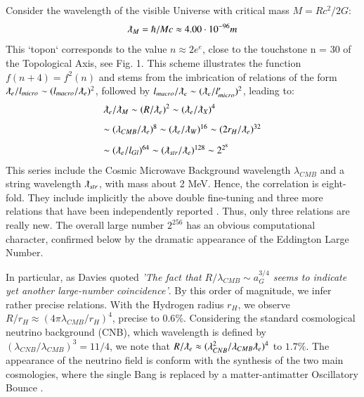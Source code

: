 \documentclass[twoside,draft]{article}
\begin{document}
\begin{sloppypar}
Consider the wavelength of the visible Universe with critical mass $M= Rc^2/2G$: 
\begin{equation}
\lambdabar_{M} = \hbar /Mc \approx 4.00 \cdot 10^{-96} m
\end{equation}
This `topon` corresponds to the value $n \approx 2e^e$, close to the touchstone n = 30 of the Topological Axis, see Fig. 1. This scheme illustrates the function $f(n + 4) = f^{2}(n)$
and stems from the imbrication of relations of the form $\lambdabar_{e} /l_{micro} \sim (l_{macro} /\lambdabar_{e})^{2}$, followed by $ l_{macro} /\lambdabar_{e} \sim (\lambdabar_{e} /l^{\prime}_{micro} )^{2}$, leading to:
$$
\begin{array}{ll}
%
\displaystyle
\lambdabar_{e}/\lambdabar_{M} \sim (R/\lambdabar_{e})^{2} \sim (\lambdabar_{e}/ \lambdabar_{X})^{4}\\[+8pt]  %
\sim (\lambda_{CMB}/ \lambdabar_{e})^{8} \sim (\lambdabar_{e}/\lambdabar_{W})^{16} \sim (2r_{H} /\lambdabar_{e})^{32}\\[+8pt] %
\sim (\lambdabar_{e}/ l_{Gl} )^{64} \sim (\lambdabar_{str} /\lambdabar_{e} )^{128} \sim 2^{2^8}\\ %
\end{array}
$$
This series include the Cosmic Microwave Background wavelength $\lambda_{CMB}$ and a string wavelength $\lambdabar_{str}$, with mass about 2 MeV. Hence, the correlation is eight-fold. They include implicitly the above double fine-tuning and three  more relations that have been independently reported \cite{Sanchez1}. Thus, only three relations are really new. The overall large number $2^{256}$ has an obvious computational character, confirmed below by the dramatic appearance of the Eddington Large Number.

In particular, as Davies quoted \cite{Davies} \textit{'The fact that $R/\lambda_{CMB}\sim a_G^{3/4}$ seems to indicate yet another large-number coincidence'}. By this order of magnitude, we infer rather precise relations. With the Hydrogen radius $r_H$, we observe 
$ R/r_H \approx (4\pi \lambda_{CMB}/r_H)^{4}$, precise to $0.6\%$. 
Considering the standard cosmological neutrino background (CNB), which wavelength is defined by $(\lambda_{CNB} / \lambda_{CMB})^{3} = 11/4$, we note that $R/ \lambdabar_{e} \approx
( \lambda_{CNB}^{2} / \lambda_{CMB} \lambdabar_{e} )^{4}$ to $1.7\%$. The appearance of the neutrino field is conform with the synthesis of the two main cosmologies, where the single Bang is replaced by a matter-antimatter Oscillatory Bounce \cite{Sanchez2}.


\end{sloppypar}
\end{document}
